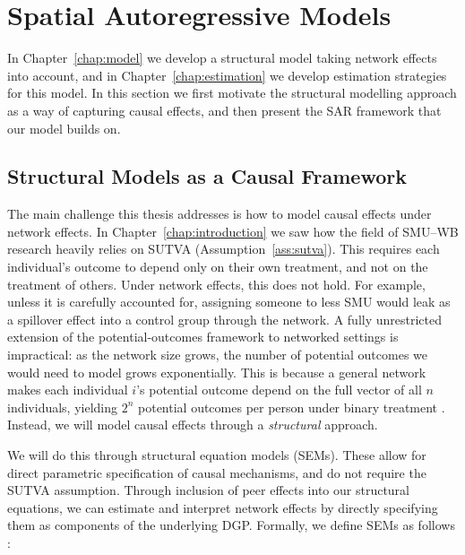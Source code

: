 \section{Spatial Autoregressive Models}
\label{sec:bg:sar}
In Chapter~\ref{chap:model} we develop a structural model taking network effects into account, and in Chapter~\ref{chap:estimation} we develop estimation strategies for this model. In this section we first motivate the structural modelling approach as a way of capturing causal effects, and then present the SAR framework that our model builds on.

\subsection{Structural Models as a Causal Framework}
\label{sec:bg:sem}
The main challenge this thesis addresses is how to model causal effects under network effects. In Chapter~\ref{chap:introduction} we saw how the field of SMU--WB research heavily relies on SUTVA (Assumption~\ref{ass:sutva}). This requires each individual's outcome to depend only on their own treatment, and not on the treatment of others. Under network effects, this does not hold. For example, unless it is carefully accounted for, assigning someone to less SMU would leak as a spillover effect into a control group through the network. A fully unrestricted extension of the potential-outcomes framework \parencite{Rubin1974} to networked settings is impractical: as the network size grows, the number of potential outcomes we would need to model grows exponentially. This is because a general network makes each individual $i$'s potential outcome depend on the full vector of all $n$ individuals, yielding $2^n$ potential outcomes per person under binary treatment \parencite[Sec.~2.1]{HudgensHalloran2008}. Instead, we will model causal effects through a \emph{structural} approach.

We will do this through structural equation models (SEMs). These allow for direct parametric specification of causal mechanisms, and do not require the SUTVA assumption. Through inclusion of peer effects into our structural equations, we can estimate and interpret network effects by directly specifying them as components of the underlying DGP\@. Formally, we define SEMs as follows \parencite[Sec.~1.4.1, p.~27; Ch.~5; Ch.~7]{Pearl2009}:

